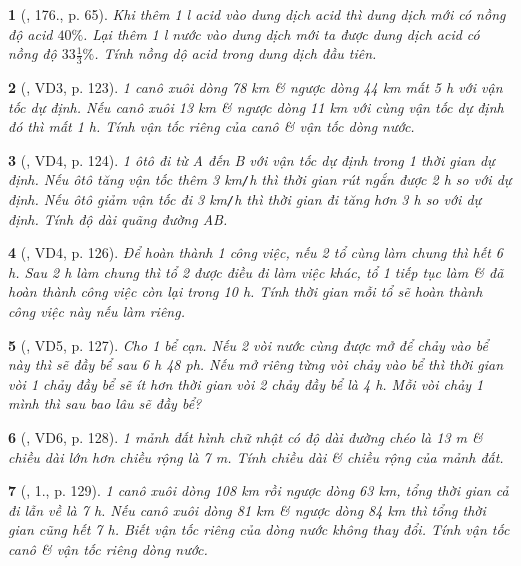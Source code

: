 \documentclass{article}
\newtheorem{baitoan}{}
\begin{document}
\begin{baitoan}[\cite{Tuyen_Toan_9_old}, 176., p. 65]
	Khi thêm {\rm 1 l} acid vào dung dịch acid thì dung dịch mới có nồng độ acid $40\%$. Lại thêm {\rm 1 l} nước vào dung dịch mới ta được dung dịch acid có nồng độ $33\frac{1}{3}\%$. Tính nồng dộ acid trong dung dịch đầu tiên.
\end{baitoan}

\begin{baitoan}[\cite{Kien_dai_so_9}, VD3, p. 123]
	1 canô xuôi dòng {\rm78 km} \& ngược dòng {\rm44 km} mất {\rm5 h} với vận tốc dự định. Nếu canô xuôi {\rm13 km} \& ngược dòng {\rm11 km} với cùng vận tốc dự định đó thì mất {\rm1 h}. Tính vận tốc riêng của canô \& vận tốc dòng nước.
\end{baitoan}

\begin{baitoan}[\cite{Kien_dai_so_9}, VD4, p. 124]
	1 ôtô đi từ A đến B với vận tốc dự định trong 1 thời gian dự định. Nếu ôtô tăng vận tốc thêm {\rm3 km{\tt/}h} thì thời gian rút ngắn được {\rm2 h} so với dự định. Nếu ôtô giảm vận tốc đi {\rm3 km{\tt/}h} thì thời gian đi tăng hơn {\rm3 h} so với dự định. Tính độ dài quãng đường AB.
\end{baitoan}

\begin{baitoan}[\cite{Kien_dai_so_9}, VD4, p. 126]
	Để hoàn thành 1 công việc, nếu 2 tổ cùng làm chung thì hết {\rm6 h}. Sau {\rm2 h} làm chung thì tổ 2 được điều đi làm việc khác, tổ 1 tiếp tục làm \& đã hoàn thành công việc còn lại trong {\rm10 h}. Tính thời gian mỗi tổ sẽ hoàn thành công việc này nếu làm riêng.
\end{baitoan}

\begin{baitoan}[\cite{Kien_dai_so_9}, VD5, p. 127]
	Cho 1 bể cạn. Nếu 2 vòi nước cùng được mở để chảy vào bể này thì sẽ đầy bể sau {\rm6 h 48 ph}. Nếu mở riêng từng vòi chảy vào bể thì thời gian vòi 1 chảy đầy bể sẽ ít hơn thời gian vòi 2 chảy đầy bể là {\rm4 h}. Mỗi vòi chảy 1 mình thì sau bao lâu sẽ đầy bể?
\end{baitoan}

\begin{baitoan}[\cite{Kien_dai_so_9}, VD6, p. 128]
	1 mảnh đất hình chữ nhật có độ dài đường chéo là {\rm13 m} \& chiều dài lớn hơn chiều rộng là {\rm7 m}. Tính chiều dài \& chiều rộng của mảnh đất.
\end{baitoan}

\begin{baitoan}[\cite{Kien_dai_so_9}, 1., p. 129]
	1 canô xuôi dòng {\rm108 km} rồi ngược dòng {\rm63 km}, tổng thời gian cả đi lẫn về là {\rm7 h}. Nếu canô xuôi dòng {\rm81 km} \& ngược dòng {\rm84 km} thì tổng thời gian cũng hết {\rm7 h}. Biết vận tốc riêng của dòng nước không thay đổi. Tính vận tốc canô \& vận tốc riêng dòng nước.
\end{baitoan}
\end{document}
